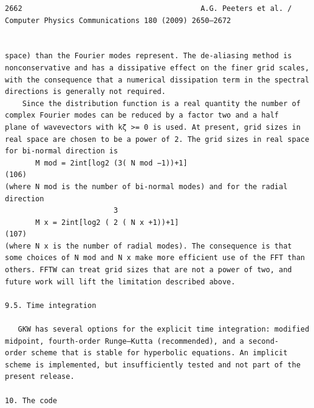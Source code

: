 \documentclass[a4paper]{article}
\newcommand{\gkwpagefont}{\fontsize{6.0pt}{7.55pt}\selectfont}
\begin{document}
\begin{Verbatim}[fontsize=\gkwpagefont]
2662                                         A.G. Peeters et al. / Computer Physics Communications 180 (2009) 2650–2672


space) than the Fourier modes represent. The de-aliasing method is nonconservative and has a dissipative effect on the finer grid scales,
with the consequence that a numerical dissipation term in the spectral directions is generally not required.
    Since the distribution function is a real quantity the number of complex Fourier modes can be reduced by a factor two and a half
plane of wavevectors with kζ >= 0 is used. At present, grid sizes in real space are chosen to be a power of 2. The grid sizes in real space
for bi-normal direction is
       M mod = 2int[log2 (3( N mod −1))+1]                                                                                               (106)
(where N mod is the number of bi-normal modes) and for the radial direction
                         3
       M x = 2int[log2 ( 2 ( N x +1))+1]                                                                                                 (107)
(where N x is the number of radial modes). The consequence is that some choices of N mod and N x make more efficient use of the FFT than
others. FFTW can treat grid sizes that are not a power of two, and future work will lift the limitation described above.

9.5. Time integration

   GKW has several options for the explicit time integration: modified midpoint, fourth-order Runge–Kutta (recommended), and a second-
order scheme that is stable for hyperbolic equations. An implicit scheme is implemented, but insufficiently tested and not part of the
present release.

10. The code


\end{Verbatim}
\end{document}
